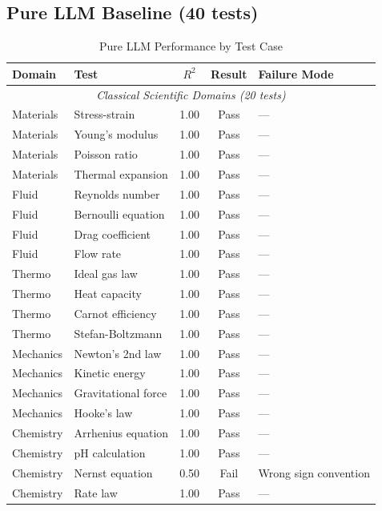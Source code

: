 \documentclass[twoside,11pt]{article}
\begin{document}
\subsection{Pure LLM Baseline (40 tests)}

\begin{table}[H]
\centering
\caption{Pure LLM Performance by Test Case}
\label{tab:llm_detailed}
\begin{small}
\begin{tabular}{@{}llccp{4.5cm}@{}}
\toprule
\textbf{Domain} & \textbf{Test} & \textbf{$R^2$} & \textbf{Result} & \textbf{Failure Mode} \\
\midrule
\multicolumn{5}{c}{\textit{Classical Scientific Domains (20 tests)}} \\
\midrule
Materials & Stress-strain & 1.00 & Pass & --- \\
Materials & Young's modulus & 1.00 & Pass & --- \\
Materials & Poisson ratio & 1.00 & Pass & --- \\
Materials & Thermal expansion & 1.00 & Pass & --- \\
Fluid & Reynolds number & 1.00 & Pass & --- \\
Fluid & Bernoulli equation & 1.00 & Pass & --- \\
Fluid & Drag coefficient & 1.00 & Pass & --- \\
Fluid & Flow rate & 1.00 & Pass & --- \\
Thermo & Ideal gas law & 1.00 & Pass & --- \\
Thermo & Heat capacity & 1.00 & Pass & --- \\
Thermo & Carnot efficiency & 1.00 & Pass & --- \\
Thermo & Stefan-Boltzmann & 1.00 & Pass & --- \\
Mechanics & Newton's 2nd law & 1.00 & Pass & --- \\
Mechanics & Kinetic energy & 1.00 & Pass & --- \\
Mechanics & Gravitational force & 1.00 & Pass & --- \\
Mechanics & Hooke's law & 1.00 & Pass & --- \\
Chemistry & Arrhenius equation \citep{arrhenius1889reaction} & 1.00 & Pass & --- \\
Chemistry & pH calculation & 1.00 & Pass & --- \\
Chemistry & Nernst equation & 0.50 & Fail & Wrong sign convention \\
Chemistry & Rate law & 1.00 & Pass & --- \\

\end{tabular}
\end{small}
\end{table}
\end{document}
